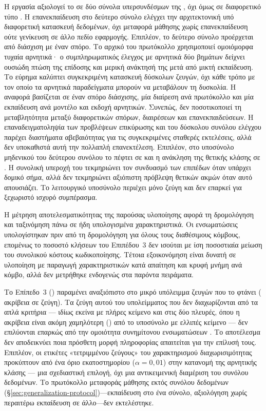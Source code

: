 Η εργασία αξιολογεί το  σε δύο σύνολα υπερσυνδέσμων της
, όχι όμως σε διαφορετικό τύπο .
Η επανεκπαίδευση στο
δεύτερο σύνολο ελέγχει την αρχιτεκτονική υπό διαφορετική κατασκευή δεδομένων,
όχι μεταφορά μάθησης χωρίς επανεκπαίδευση ούτε γενίκευση σε άλλο πεδίο εφαρμογής.
Επιπλέον, το δεύτερο σύνολο προέρχεται από διάσχιση  με έναν σπόρο.
Το αρχικό του πρωτόκολλο χρησιμοποιεί ομοιόμορφα τυχαία αρνητικά· ο
συμπληρωματικός έλεγχος με αρνητικά δύο βημάτων δείχνει ουσιώδη πτώση της
επίδοσης και μερική ανάκτησή της μετά από μικτή εκπαίδευση.
Το εύρημα καλύπτει συγκεκριμένη κατασκευή δύσκολων ζευγών, όχι κάθε τρόπο
με τον οποίο τα αρνητικά παραδείγματα μπορούν να μεταβάλουν τη δυσκολία.
Η αναφορά βασίζεται σε έναν σπόρο διάσχισης, μία διαίρεση ανά πρωτόκολλο και μία
εκπαίδευση ανά μοντέλο και εκδοχή αρνητικών.
Συνεπώς, δεν ποσοτικοποιεί τη μεταβλητότητα μεταξύ
διαφορετικών σπόρων, διαιρέσεων και επανεκπαιδεύσεων.
Η επαναδειγματοληψία  των προβλέψεων επικύρωσης και του
δύσκολου συνόλου ελέγχου παρέχει διαστήματα αβεβαιότητας για τις συγκεκριμένες
σταθερές εκτελέσεις, αλλά δεν υποκαθιστά αυτή την πολλαπλή επανεκτέλεση.
Επιπλέον, στο υποσύνολο μηδενικού  του δεύτερου συνόλου το 
πέφτει σε \WfZeroCnFone{} και η ανάκληση της θετικής κλάσης σε
\WfZeroCnPositiveRecall{}.
Η συνολική υπεροχή του  τεκμηριώνει τον
συνδυασμό των επιπέδων όταν υπάρχει δομικό σήμα, αλλά δεν τεκμηριώνει αξιόπιστη
πρόβλεψη θετικών ακμών όταν αυτό απουσιάζει.
Το λειτουργικό υποσύνολο
 περιέχει μόνο \WfColdStartCount{} ζεύγη και δεν επαρκεί για
ξεχωριστό ισχυρό συμπέρασμα.

Η μέτρηση αποτελεσματικότητας της παρούσας υλοποίησης αφορά τη δρομολόγηση και
ταξινόμηση πάνω σε ήδη υπολογισμένα χαρακτηριστικά.
Οι ενσωματώσεις
 υπολογίστηκαν πριν από τη δρομολόγηση για όλους τους
διαθέσιμους κόμβους, επομένως το ποσοστό κλήσεων του Επιπέδου~3 δεν ισούται με
ίση ποσοστιαία μείωση του συνολικού κόστους κωδικοποίησης.
Τέτοια εξοικονόμηση
είναι δυνατή σε υλοποίηση με παραγωγή χαρακτηριστικών κατά απαίτηση και κρυφή
μνήμη ανά κόμβο, αλλά δεν μετρήθηκε ενδογενώς στα παρόντα πειράματα.

Το Επίπεδο~3 (\texttt{}) παραμένει αναξιόπιστο στο μικρό
υπόλειμμα ζευγών που το φτάνει (\TierThreeAcc{} ακρίβεια σε \TierThreeCount{} ζεύγη).
Τα ζεύγη αυτού του υπολείμματος που δεν διαχωρίζονται από τα απλά κριτήρια ---
ιδίως εκείνα με πλήρες κείμενο και στις δύο πλευρές,
όπου η ακρίβεια είναι ακόμη χαμηλότερη (\HardResCompleteAcc{}) από το υποσύνολο με ελλιπές
κείμενο --- δεν επιλύονται επαρκώς από την ομοιότητα συνημίτονου ενσωματώσεων
.
Το αποτέλεσμα δεν αποδεικνύει ποια πρόσθετη μορφή
πληροφορίας απαιτείται για την επίλυσή τους.
Επιπλέον, οι ετικέτες
«τετριμμένου ζεύγους» του χαρακτηρισμού διαχωρισιμότητας προκύπτουν από ένα όριο
εκατοστημορίου ($\alpha = 0{,}01$) στην κατανομή της αρνητικής κλάσης --- μια
σχεδιαστική επιλογή, όχι μια αντικειμενική διαμέριση του συνόλου δεδομένων.
Το πρωτόκολλο μεταφοράς μάθησης εκτός συνόλου δεδομένων
(\S\ref{sec:generalization-protocol})---εκπαίδευση στο ένα σύνολο, αξιολόγηση
χωρίς περαιτέρω εκπαίδευση σε άλλο---δεν εκτελέστηκε.

